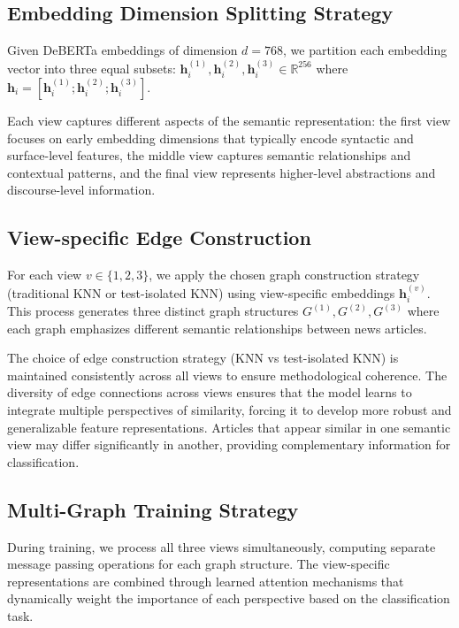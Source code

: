 \subsection{Embedding Dimension Splitting Strategy}

Given DeBERTa embeddings of dimension $d = 768$, we partition each embedding vector into three equal subsets: $\mathbf{h}_i^{(1)}, \mathbf{h}_i^{(2)}, \mathbf{h}_i^{(3)} \in \mathbb{R}^{256}$ where $\mathbf{h}_i = [\mathbf{h}_i^{(1)}; \mathbf{h}_i^{(2)}; \mathbf{h}_i^{(3)}]$.

Each view captures different aspects of the semantic representation: the first view focuses on early embedding dimensions that typically encode syntactic and surface-level features, the middle view captures semantic relationships and contextual patterns, and the final view represents higher-level abstractions and discourse-level information.

\subsection{View-specific Edge Construction}

For each view $v \in \{1, 2, 3\}$, we apply the chosen graph construction strategy (traditional KNN or test-isolated KNN) using view-specific embeddings $\mathbf{h}_i^{(v)}$. This process generates three distinct graph structures $G^{(1)}, G^{(2)}, G^{(3)}$ where each graph emphasizes different semantic relationships between news articles.

The choice of edge construction strategy (KNN vs test-isolated KNN) is maintained consistently across all views to ensure methodological coherence. The diversity of edge connections across views ensures that the model learns to integrate multiple perspectives of similarity, forcing it to develop more robust and generalizable feature representations. Articles that appear similar in one semantic view may differ significantly in another, providing complementary information for classification.

\subsection{Multi-Graph Training Strategy}

During training, we process all three views simultaneously, computing separate message passing operations for each graph structure. The view-specific representations are combined through learned attention mechanisms that dynamically weight the importance of each perspective based on the classification task.


